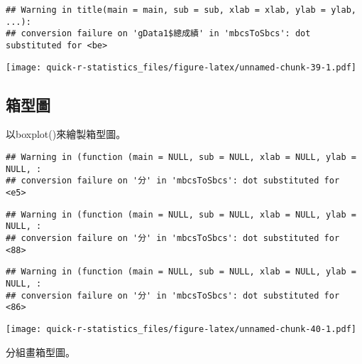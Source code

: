 \documentclass[
]{book}
\newenvironment{Shaded}{\begin{snugshade}}{\end{snugshade}}
\newcommand{\AttributeTok}[1]{\textcolor[rgb]{0.77,0.63,0.00}{#1}}
\newcommand{\FunctionTok}[1]{\textcolor[rgb]{0.00,0.00,0.00}{#1}}
\newcommand{\NormalTok}[1]{#1}
\newcommand{\SpecialCharTok}[1]{\textcolor[rgb]{0.00,0.00,0.00}{#1}}
\newcommand{\StringTok}[1]{\textcolor[rgb]{0.31,0.60,0.02}{#1}}
\begin{document}
\begin{verbatim}
## Warning in title(main = main, sub = sub, xlab = xlab, ylab = ylab, ...):
## conversion failure on 'gData1$總成績' in 'mbcsToSbcs': dot substituted for <be>
\end{verbatim}

\texttt{[image: quick-r-statistics\_files/figure-latex/unnamed-chunk-39-1.pdf]}

\hypertarget{ux7bb1ux578bux5716}{%
\subsection{箱型圖}\label{ux7bb1ux578bux5716}}

以boxplot()來繪製箱型圖。

\begin{Shaded}
\end{Shaded}

\begin{verbatim}
## Warning in (function (main = NULL, sub = NULL, xlab = NULL, ylab = NULL, :
## conversion failure on '分' in 'mbcsToSbcs': dot substituted for <e5>
\end{verbatim}

\begin{verbatim}
## Warning in (function (main = NULL, sub = NULL, xlab = NULL, ylab = NULL, :
## conversion failure on '分' in 'mbcsToSbcs': dot substituted for <88>
\end{verbatim}

\begin{verbatim}
## Warning in (function (main = NULL, sub = NULL, xlab = NULL, ylab = NULL, :
## conversion failure on '分' in 'mbcsToSbcs': dot substituted for <86>
\end{verbatim}

\texttt{[image: quick-r-statistics\_files/figure-latex/unnamed-chunk-40-1.pdf]}

分組畫箱型圖。

\begin{Shaded}
\end{Shaded}
\end{document}
